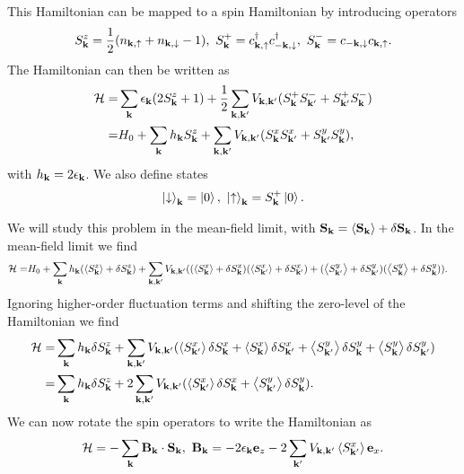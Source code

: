 This Hamiltonian can be mapped to a spin Hamiltonian by introducing operators
\begin{align*}
	S_{\vb{k}}^{z} = \frac{1}{2}(n_{\vb{k}, \uparrow} + n_{\vb{k}, \downarrow} - 1),\ S_{\vb{k}}^{+} = c_{\vb{k}, \uparrow}^{\dagger} c_{-\vb{k}, \downarrow}^{\dagger},\ S_{\vb{k}}^{-} = c_{-\vb{k}, \downarrow}c_{\vb{k}, \uparrow}.
\end{align*}
The Hamiltonian can then be written as
\begin{align*}
	\mathcal{H} =& \sum\limits_{\vb{k}}\epsilon_{\vb{k}}(2S_{\vb{k}}^{z} + 1) + \frac{1}{2}\sum\limits_{\vb{k}, \vb{k}^{\prime}}V_{\vb{k}, \vb{k}^{\prime}}(S_{\vb{k}}^{+}S_{\vb{k}^{\prime}}^{-} + S_{\vb{k}^{\prime}}^{+}S_{\vb{k}}^{-}) \\
	     =& H_{0} + \sum\limits_{\vb{k}}h_{\vb{k}}S_{\vb{k}}^{z} + \sum\limits_{\vb{k}, \vb{k}^{\prime}}V_{\vb{k}, \vb{k}^{\prime}}(S_{\vb{k}}^{x}S_{\vb{k}^{\prime}}^{x} + S_{\vb{k}^{\prime}}^{y}S_{\vb{k}}^{y}),
\end{align*}
with $h_{\vb{k}} = 2\epsilon_{\vb{k}}$. We also define states
\begin{align*}
	\ket{\downarrow}_{\vb{k}} = \ket{0},\ \ket{\uparrow}_{\vb{k}} = S_{\vb{k}}^{+}\ket{0}.
\end{align*}

We will study this problem in the mean-field limit, with $\vb{S}_{\vb{k}} = \expval{\vb{S}_{\vb{k}}} + \delta\vb{S}_{\vb{k}}$. In the mean-field limit we find
\begin{align*}
	\mathcal{H} =& H_{0} + \sum\limits_{\vb{k}}h_{\vb{k}}(\expval{S^{z}_{\vb{k}}} + \delta S^{z}_{\vb{k}}) + \sum\limits_{\vb{k}, \vb{k}^{\prime}}V_{\vb{k}, \vb{k}^{\prime}}((\expval{S^{x}_{\vb{k}}} + \delta S^{x}_{\vb{k}})(\expval{S^{x}_{\vb{k}\ensuremath{^{\prime}}}} + \delta S^{x}_{\vb{k}^{\prime}}) + (\expval{S^{y}_{\vb{k}\ensuremath{^{\prime}}}} + \delta S^{y}_{\vb{k}^{\prime}})(\expval{S^{y}_{\vb{k}}} + \delta S^{y}_{\vb{k}})).
\end{align*}
Ignoring higher-order fluctuation terms and shifting the zero-level of the Hamiltonian we find
\begin{align*}
	\mathcal{H} =& \sum\limits_{\vb{k}}h_{\vb{k}}\delta S^{z}_{\vb{k}} + \sum\limits_{\vb{k}, \vb{k}^{\prime}}V_{\vb{k}, \vb{k}^{\prime}}(\expval{S^{x}_{\vb{k}\ensuremath{^{\prime}}}}\delta S^{x}_{\vb{k}} + \expval{S^{x}_{\vb{k}}}\delta S^{x}_{\vb{k}^{\prime}} + \expval{S^{y}_{\vb{k}\ensuremath{^{\prime}}}}\delta S^{y}_{\vb{k}} + \expval{S^{y}_{\vb{k}}}\delta S^{y}_{\vb{k}^{\prime}}) \\
	     =& \sum\limits_{\vb{k}}h_{\vb{k}}\delta S^{z}_{\vb{k}} + 2\sum\limits_{\vb{k}, \vb{k}^{\prime}}V_{\vb{k}, \vb{k}^{\prime}}(\expval{S^{x}_{\vb{k}\ensuremath{^{\prime}}}}\delta S^{x}_{\vb{k}} + \expval{S^{y}_{\vb{k}\ensuremath{^{\prime}}}}\delta S^{y}_{\vb{k}}).
\end{align*}
We can now rotate the spin operators to write the Hamiltonian as
\begin{align*}
	\ham = -\sum\limits_{\vb{k}}\vb{B}_{\vb{k}}\cdot\vb{S}_{\vb{k}},\ \vb{B}_{\vb{k}} = -2\epsilon_{\vb{k}}\vb{e}_{z} - 2\sum\limits_{\vb{k}\p}V_{\vb{k}, \vb{k}\p}\expval{S_{\vb{k}\p}^{x}}\vb{e}_{x}.
\end{align*}

